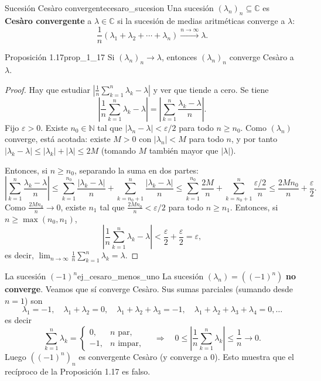 \begin{definicion}{Sucesión Cesàro convergente}{cesaro_sucesion}
Una sucesión $(\lambda_n)_n \subseteq \mathbb{C}$ es \textbf{Cesàro convergente} a $\lambda \in \mathbb{C}$ si la sucesión de medias aritméticas converge a $\lambda$:
\[
\frac{1}{n}(\lambda_1 + \lambda_2 + \cdots + \lambda_n) \xrightarrow{n\to\infty} \lambda.
\]
\end{definicion}

\begin{proposicion}{Proposición 1.17}{prop_1_17}
Si $(\lambda_n)_n \to \lambda$, entonces $(\lambda_n)_n$ converge Cesàro a $\lambda$.
\end{proposicion}

\begin{proof}
Hay que estudiar $\left| \frac{1}{n} \sum_{k=1}^n \lambda_k - \lambda \right|$ y ver que tiende a cero. Se tiene
\[
\left| \frac{1}{n} \sum_{k=1}^n \lambda_k - \lambda \right| = \left| \sum_{k=1}^n \frac{\lambda_k - \lambda}{n} \right|.
\]
Fijo $\varepsilon > 0$. Existe $n_0 \in \mathbb{N}$ tal que $|\lambda_n - \lambda| < \varepsilon/2$ para todo $n \ge n_0$. Como $(\lambda_n)$ converge, está acotada: existe $M > 0$ con $|\lambda_n| < M$ para todo $n$, y por tanto $|\lambda_k - \lambda| \le |\lambda_k| + |\lambda| \le 2M$ (tomando $M$ también mayor que $|\lambda|$).

Entonces, si $n \ge n_0$, separando la suma en dos partes:
\[
\left| \sum_{k=1}^n \frac{\lambda_k - \lambda}{n} \right| \le \sum_{k=1}^{n_0} \frac{|\lambda_k - \lambda|}{n} + \sum_{k=n_0+1}^n \frac{|\lambda_k - \lambda|}{n} \le \sum_{k=1}^{n_0} \frac{2M}{n} + \sum_{k=n_0+1}^n \frac{\varepsilon/2}{n} \le \frac{2M n_0}{n} + \frac{\varepsilon}{2}.
\]
Como $\frac{2Mn_0}{n} \to 0$, existe $n_1$ tal que $\frac{2Mn_0}{n} < \varepsilon/2$ para todo $n \ge n_1$. Entonces, si $n \ge \max(n_0,n_1)$,
\[
\left| \frac{1}{n} \sum_{k=1}^n \lambda_k - \lambda \right| < \frac{\varepsilon}{2} + \frac{\varepsilon}{2} = \varepsilon,
\]
es decir, $\lim_{n\to\infty} \frac{1}{n}\sum_{k=1}^n \lambda_k = \lambda$.
\end{proof}

\begin{ejemplo}{La sucesión $(-1)^n$}{ej_cesaro_menos_uno}
La sucesión $(\lambda_n) = ((-1)^n)$ \textbf{no converge}. Veamos que sí converge Cesàro. Sus sumas parciales (sumando desde $n=1$) son
\[
\lambda_1 = -1, \quad \lambda_1 + \lambda_2 = 0, \quad \lambda_1+\lambda_2+\lambda_3 = -1, \quad \lambda_1+\lambda_2+\lambda_3+\lambda_4 = 0, \dots
\]
es decir
\[
\sum_{k=1}^n \lambda_k = \begin{cases} 0, & n \text{ par}, \\ -1, & n \text{ impar}, \end{cases} \quad \Longrightarrow \quad 0 \le \left| \frac{1}{n} \sum_{k=1}^n \lambda_k \right| \le \frac{1}{n} \to 0.
\]
Luego $((-1)^n)_n$ es convergente Cesàro (y converge a $0$). Esto muestra que el recíproco de la Proposición 1.17 es falso.
\end{ejemplo}

